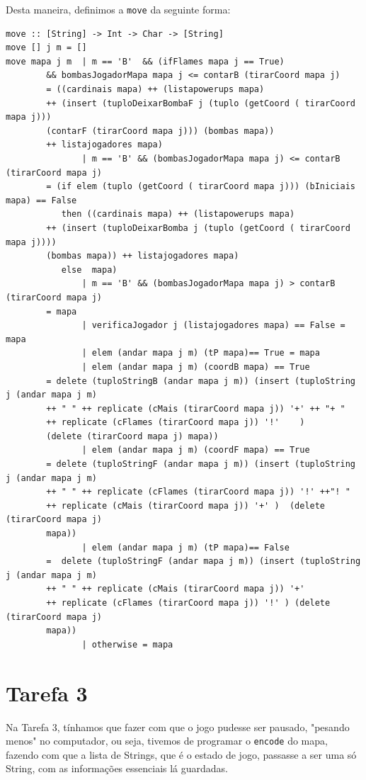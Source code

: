 \documentclass[a4paper]{article}
\begin{document}
Desta maneira, definimos a \texttt{move} da seguinte forma:
\begin{verbatim}
move :: [String] -> Int -> Char -> [String]
move [] j m = []
move mapa j m  | m == 'B'  && (ifFlames mapa j == True) 
        && bombasJogadorMapa mapa j <= contarB (tirarCoord mapa j)   
        = ((cardinais mapa) ++ (listapowerups mapa) 
        ++ (insert (tuploDeixarBombaF j (tuplo (getCoord ( tirarCoord mapa j))) 
        (contarF (tirarCoord mapa j))) (bombas mapa)) 
        ++ listajogadores mapa)
               | m == 'B' && (bombasJogadorMapa mapa j) <= contarB (tirarCoord mapa j) 
        = (if elem (tuplo (getCoord ( tirarCoord mapa j))) (bIniciais mapa) == False  
           then ((cardinais mapa) ++ (listapowerups mapa) 
        ++ (insert (tuploDeixarBomba j (tuplo (getCoord ( tirarCoord mapa j)))) 
        (bombas mapa)) ++ listajogadores mapa)
           else  mapa)
               | m == 'B' && (bombasJogadorMapa mapa j) > contarB (tirarCoord mapa j) 
        = mapa
               | verificaJogador j (listajogadores mapa) == False = mapa  
               | elem (andar mapa j m) (tP mapa)== True = mapa 
               | elem (andar mapa j m) (coordB mapa) == True  
        = delete (tuploStringB (andar mapa j m)) (insert (tuploString j (andar mapa j m) 
        ++ " " ++ replicate (cMais (tirarCoord mapa j)) '+' ++ "+ "  
        ++ replicate (cFlames (tirarCoord mapa j)) '!'    )  
        (delete (tirarCoord mapa j) mapa)) 
               | elem (andar mapa j m) (coordF mapa) == True  
        = delete (tuploStringF (andar mapa j m)) (insert (tuploString j (andar mapa j m) 
        ++ " " ++ replicate (cFlames (tirarCoord mapa j)) '!' ++"! " 
        ++ replicate (cMais (tirarCoord mapa j)) '+' )  (delete (tirarCoord mapa j) 
        mapa)) 
               | elem (andar mapa j m) (tP mapa)== False 
        =  delete (tuploStringF (andar mapa j m)) (insert (tuploString j (andar mapa j m) 
        ++ " " ++ replicate (cMais (tirarCoord mapa j)) '+' 
        ++ replicate (cFlames (tirarCoord mapa j)) '!' ) (delete (tirarCoord mapa j) 
        mapa))       
               | otherwise = mapa
\end{verbatim}

\section{Tarefa 3}
\label{t3}

Na Tarefa 3, tínhamos que fazer com que o jogo pudesse ser pausado, "pesando menos" no computador, ou seja, tivemos de programar o \texttt{encode} do mapa, fazendo com que a lista de Strings, que é o estado de jogo, passasse a ser uma só String, com as informações essenciais lá guardadas.
\end{document}
